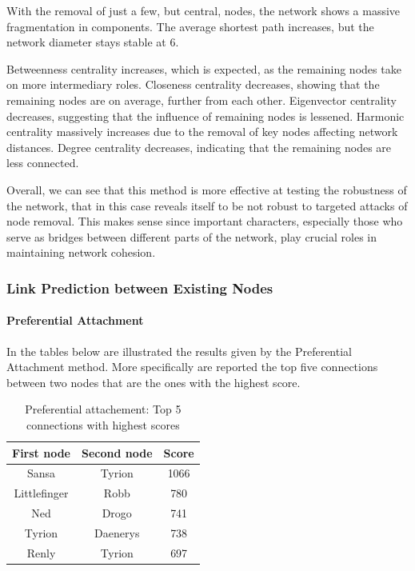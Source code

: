 \documentclass[10pt,twocolumn,letterpaper]{article}
\begin{document}
With the removal of just a few, but central, nodes, the network shows a massive fragmentation in components. The average shortest path increases, but the network diameter stays stable at 6. 

Betweenness centrality increases, which is expected, as the remaining nodes take on more intermediary roles. Closeness centrality decreases, showing that the remaining nodes are on average, further from each other. Eigenvector centrality decreases, suggesting that the influence of remaining nodes is lessened. Harmonic centrality massively increases due to the removal of key nodes affecting network distances.
Degree centrality decreases, indicating that the remaining nodes are less connected.

Overall, we can see that this method is more effective at testing the robustness of the network, that in this case reveals itself to be not robust to targeted attacks of node removal. This makes sense since important characters, especially those who serve as bridges between different parts of the network, play crucial roles in maintaining network cohesion.




\subsubsection{Link Prediction between Existing Nodes}

\paragraph{Preferential Attachment}
In the tables below are illustrated the results given by the Preferential Attachment method. More specifically are reported the top five connections between two nodes that are the ones with the highest score.
\begin{table}[!h]
    \centering
    \small
    \begin{tabular}{c|c|c} 
    First node & Second node & Score \\
    \hline
    Sansa & Tyrion & 1066 \\
    Littlefinger & Robb	& 780 \\
    Ned & Drogo & 741 \\
    Tyrion & Daenerys &	738 \\
    Renly & Tyrion & 697 \\
    \hline 
    \end{tabular}
    \caption{Preferential attachement: Top 5 connections with highest scores}
    \label{tab:my_label}
\end{table}
\end{document}
